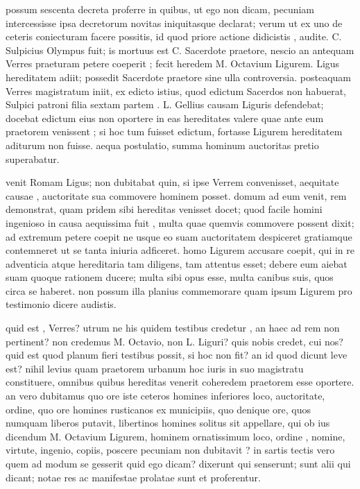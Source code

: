  possum sescenta decreta proferre in quibus, ut ego non dicam, pecuniam intercessisse ipsa decretorum novitas iniquitasque declarat; verum ut ex uno de ceteris coniecturam facere possitis, id quod priore actione didicistis , audite. C. Sulpicius Olympus fuit; is mortuus est C. Sacerdote praetore, nescio an antequam Verres praeturam petere coeperit ; fecit heredem M. Octavium Ligurem. Ligus hereditatem adiit; possedit Sacerdote praetore sine ulla controversia. posteaquam Verres magistratum iniit, ex edicto istius, quod edictum Sacerdos non habuerat, Sulpici patroni filia sextam partem . L. Gellius causam Liguris defendebat; docebat edictum eius non oportere in eas hereditates valere quae ante eum praetorem venissent ; si hoc tum fuisset edictum, fortasse Ligurem hereditatem aditurum non fuisse. aequa postulatio, summa hominum auctoritas pretio superabatur.

 venit Romam Ligus; non dubitabat quin, si ipse Verrem convenisset, aequitate causae , auctoritate sua commovere hominem posset. domum ad eum venit, rem demonstrat, quam pridem sibi hereditas venisset docet; quod facile homini ingenioso in causa aequissima fuit , multa quae quemvis commovere possent dixit; ad extremum petere coepit ne usque eo suam auctoritatem despiceret gratiamque contemneret ut se tanta iniuria adficeret. homo Ligurem accusare coepit, qui in re adventicia atque hereditaria tam diligens, tam attentus esset; debere eum aiebat suam quoque rationem ducere; multa sibi opus esse, multa canibus suis, quos circa se haberet. non possum illa planius commemorare quam ipsum Ligurem pro testimonio dicere audistis.

 quid est , Verres? utrum ne his quidem testibus credetur , an haec ad rem non pertinent? non credemus M. Octavio, non L. Liguri? quis nobis credet, cui nos? quid est quod planum fieri testibus possit, si hoc non fit? an id quod dicunt leve est? nihil levius quam praetorem urbanum hoc iuris in suo magistratu constituere, omnibus quibus hereditas venerit coheredem praetorem esse oportere. an vero dubitamus quo ore iste ceteros homines inferiores loco, auctoritate, ordine, quo ore homines rusticanos ex municipiis, quo denique ore, quos numquam liberos putavit, libertinos homines solitus sit appellare, qui ob ius dicendum M. Octavium Ligurem, hominem ornatissimum loco, ordine , nomine, virtute, ingenio, copiis, poscere pecuniam non dubitavit ? in sartis tectis vero quem ad modum se gesserit quid ego dicam? dixerunt qui senserunt; sunt alii qui dicant; notae res ac manifestae prolatae sunt et proferentur.

